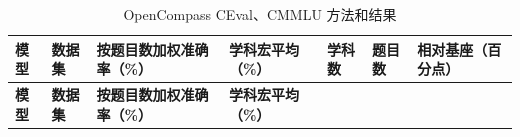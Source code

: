 \documentclass[UTF8,fontset=fandol,a4paper,11pt]{ctexart}
\begin{document}
\Needspace{135pt}

\begin{longtable}[]{@{}
  >{\raggedright\arraybackslash}p{}
  >{\raggedright\arraybackslash}p{}
  >{\raggedleft\arraybackslash}p{}
  >{\raggedleft\arraybackslash}p{}
  >{\raggedleft\arraybackslash}p{}
  >{\raggedleft\arraybackslash}p{}
  >{\raggedleft\arraybackslash}p{}@{}}
\caption{OpenCompass CEval、CMMLU 方法和结果}\tabularnewline
\toprule\noalign{}
\begin{minipage}[b]{\linewidth}\raggedright
\textbf{模型}
\end{minipage} & \begin{minipage}[b]{\linewidth}\raggedright
\textbf{数据集}
\end{minipage} & \begin{minipage}[b]{\linewidth}\raggedleft
\textbf{按题目数加权准确率（\%）}
\end{minipage} & \begin{minipage}[b]{\linewidth}\raggedleft
\textbf{学科宏平均（\%）}
\end{minipage} & \begin{minipage}[b]{\linewidth}\raggedleft
\textbf{学科数}
\end{minipage} & \begin{minipage}[b]{\linewidth}\raggedleft
\textbf{题目数}
\end{minipage} & \begin{minipage}[b]{\linewidth}\raggedleft
\textbf{相对基座（百分点）}
\end{minipage} \\
\midrule\noalign{}
\endfirsthead
\toprule\noalign{}
\begin{minipage}[b]{\linewidth}\raggedright
\textbf{模型}
\end{minipage} & \begin{minipage}[b]{\linewidth}\raggedright
\textbf{数据集}
\end{minipage} & \begin{minipage}[b]{\linewidth}\raggedleft
\textbf{按题目数加权准确率（\%）}
\end{minipage} & \begin{minipage}[b]{\linewidth}\raggedleft
\textbf{学科宏平均（\%）}
\end{minipage} & \begin{minipage}[b]{\linewidth}\raggedleft

\end{minipage}
\end{longtable}
\end{document}
